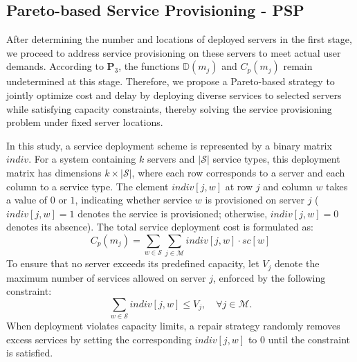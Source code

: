 \documentclass[10pt, conference, letterpaper]{IEEEtran}
\begin{document}
\subsection{Pareto-based Service Provisioning - PSP}
After determining the number and locations of deployed servers in the first stage, we proceed to address service provisioning on these servers to meet actual user demands. According to $\textbf{P}_3$, the functions $\mathbb{D}(m_j)$ and $C_{p}(m_j)$ remain undetermined at this stage. Therefore, we propose a Pareto-based strategy to jointly optimize cost and delay by deploying diverse services to selected servers while satisfying capacity constraints, thereby solving the service provisioning problem under fixed server locations.

In this study, a service deployment scheme is represented by a binary matrix $\textit{indiv}$. For a system containing $k$ servers and $|\mathcal{S}|$ service types, this deployment matrix has dimensions $k \times |\mathcal{S}|$, where each row corresponds to a server and each column to a service type. The element $\textit{indiv}[j, w]$ at row $j$ and column $w$ takes a value of $0$ or $1$, indicating whether service $w$ is provisioned on server $j$ ($\textit{indiv}[j, w] = 1$ denotes the service is provisioned; otherwise, $\textit{indiv}[j, w] = 0$ denotes its absence). The total service deployment cost is formulated as:
\begin{equation}
C_{p}(m_j) = \sum_{w \in \mathcal{S}} \sum_{j \in \mathcal{M}} \textit{indiv}[j, w] \cdot sc[w]
\end{equation}
To ensure that no server exceeds its predefined capacity, let $V_j$ denote the maximum number of services allowed on server $j$, enforced by the following constraint:
\begin{equation}
\sum_{w \in \mathcal{S}} \textit{indiv}[j, w] \leq V_j, \quad \forall j \in \mathcal{M}.
\end{equation}
When deployment violates capacity limits, a repair strategy randomly removes excess services by setting the corresponding $\textit{indiv}[j, w]$ to $0$ until the constraint is satisfied.
\end{document}
